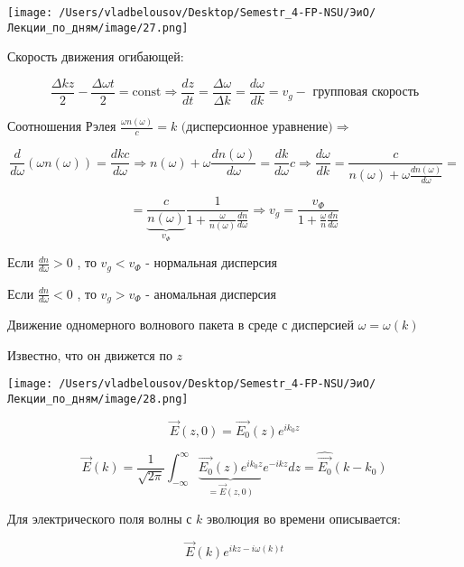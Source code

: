 \documentclass[12pt, a4paper]{report}
\begin{document}
\begin{center}
    \texttt{[image: /Users/vladbelousov/Desktop/Semestr\_4-FP-NSU/ЭиО/Лекции\_по\_дням/image/27.png]}
\end{center}

Скорость движения огибающей: 

\[ \frac{\Delta k z }{ 2 }  - \frac{\Delta \omega t }{2 }  = \mathrm{const }  \Rightarrow \frac{dz}{dt } = \frac{ \Delta \omega }{\Delta k } = \frac{d \omega }{ dk }  = v_{g} - \text{ групповая скорость}     \] 

Соотношения Рэлея \( \displaystyle \frac{\omega n( \omega)}{c }  = k \text{ (дисперсионное уравнение)} \Rightarrow   \) 

\[ \frac{d}{d \omega} ( \omega n ( \omega)) = \frac{ dk c }{d \omega } \Rightarrow n(\omega ) + \omega \frac{dn( \omega )}{d \omega } = \frac{dk}{d \omega } c \Rightarrow   \frac{d \omega } {dk } = \frac{ c }{ n( \omega ) + \omega \frac{ dn (\omega)}{d \omega} }  =       \] 

\[ =\underbrace{ \frac{c}{ n ( \omega )}}_{v_{\Phi } } \frac{1}{ 1+ \frac{\omega}{n ( \omega )}\frac{dn}{d \omega}  }  \Rightarrow v_g = \frac{v_{\Phi} } {1+ \frac{\omega}{ n } \frac{dn}{d \omega}  }   \] 

Если \( \displaystyle  \frac{dn}{d \omega }> 0   \) , то \( v_g< v_{\Phi}  \) - нормальная дисперсия

Если  \( \displaystyle  \frac{dn}{d \omega }< 0   \) , то \( v_g>v_{\Phi}  \) - аномальная дисперсия

Движение одномерного волнового пакета в среде с дисперсией \( \omega = \omega( k ) \) 

Известно, что он движется по \( z \) 

\begin{center}
    \texttt{[image: /Users/vladbelousov/Desktop/Semestr\_4-FP-NSU/ЭиО/Лекции\_по\_дням/image/28.png]}
\end{center}

\[ \vec{E } ( z, 0 )= \vec{E_0 } ( z ) e^{i k_0 z}   \] 

\[ \vec{E }  ( k ) =\frac{1}{\sqrt{2 \pi } } \int_{-\infty}^{\infty} \underbrace{\vec{E_0}  (z ) e^{i k_0 z }}_{=\vec{E }  (z,0)} e^{- ik z } dz =\hat{ \vec{E_0}  }( k- k_0 )      \] 

Для электрического поля волны с \( k  \)  эволюция во времени описывается: 

\[ \vec{E }  ( k ) e^{ikz - i\omega(k ) t }  \] 
\end{document}
